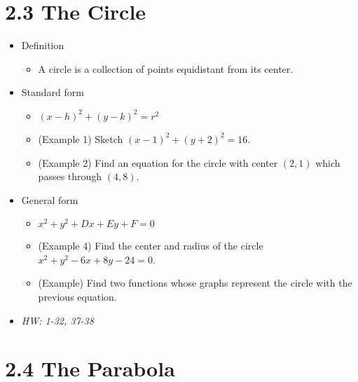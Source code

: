 \documentclass[11pt]{article}
\begin{document}
\section*{2.3 The Circle}

\begin{itemize}
  \item Definition
    \begin{itemize}
      \item A circle is a collection of points equidistant from its center.
    \end{itemize}
  \item Standard form
    \begin{itemize}
      \item \((x-h)^2+(y-k)^2=r^2\)
      \item (Example 1) Sketch \((x-1)^2+(y+2)^2=16\).
      \item (Example 2) Find an equation for the circle with center \((2,1)\)
            which passes through \((4,8)\).
    \end{itemize}
  \item General form
    \begin{itemize}
      \item \(x^2+y^2+Dx+Ey+F=0\)
      \item (Example 4) Find the center and radius of the circle
            \(x^2+y^2-6x+8y-24=0\).
      \item (Example) Find two functions whose graphs represent the circle
            with the previous equation.
    \end{itemize}
  \item\textit{
    HW: 1-32, 37-38
  }
\end{itemize}

\section*{2.4 The Parabola}
\end{document}
